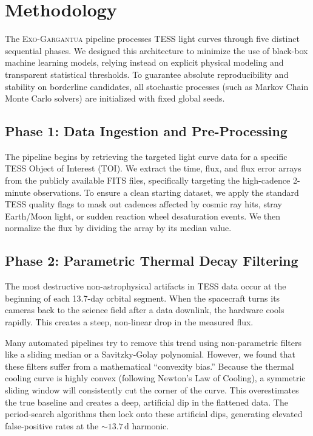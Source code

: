\documentclass[twocolumn,linenumbers]{aastex701}
\begin{document}
\section{Methodology} \label{sec:methods}

The \textsc{Exo-Gargantua} pipeline processes TESS light curves through five distinct sequential phases. We designed this architecture to minimize the use of black-box machine learning models, relying instead on explicit physical modeling and transparent statistical thresholds. To guarantee absolute reproducibility and stability on borderline candidates, all stochastic processes (such as Markov Chain Monte Carlo solvers) are initialized with fixed global seeds.

\subsection{Phase 1: Data Ingestion and Pre-Processing}
The pipeline begins by retrieving the targeted light curve data for a specific TESS Object of Interest (TOI). We extract the time, flux, and flux error arrays from the publicly available FITS files, specifically targeting the high-cadence 2-minute observations. To ensure a clean starting dataset, we apply the standard TESS quality flags to mask out cadences affected by cosmic ray hits, stray Earth/Moon light, or sudden reaction wheel desaturation events. We then normalize the flux by dividing the array by its median value. 

\subsection{Phase 2: Parametric Thermal Decay Filtering}
The most destructive non-astrophysical artifacts in TESS data occur at the beginning of each 13.7-day orbital segment. When the spacecraft turns its cameras back to the science field after a data downlink, the hardware cools rapidly. This creates a steep, non-linear drop in the measured flux. 

Many automated pipelines try to remove this trend using non-parametric filters like a sliding median or a Savitzky-Golay polynomial. However, we found that these filters suffer from a mathematical ``convexity bias.'' Because the thermal cooling curve is highly convex (following Newton's Law of Cooling), a symmetric sliding window will consistently cut the corner of the curve. This overestimates the true baseline and creates a deep, artificial dip in the flattened data. The period-search algorithms then lock onto these artificial dips, generating elevated false-positive rates at the $\sim 13.7\,\text{d}$ harmonic.
\end{document}
